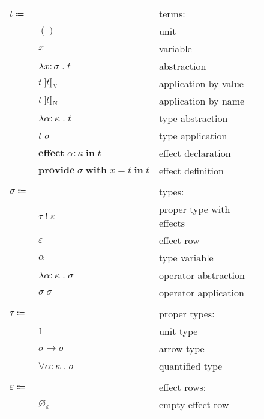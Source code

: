 \documentclass[12pt]{article}
\newcommand\anno[2]{#1 : #2} %
\newcommand\term{t}
\newcommand\eunit{()}
\newcommand\evar{x}
\newcommand\eabs[2]{\lambda #1 \; . \; #2} %
\newcommand\eappbv[2]{#1 \left\llbracket #2 \right\rrbracket_{\textsc{V}}} %
\newcommand\eappbn[2]{#1 \left\llbracket #2 \right\rrbracket_{\textsc{N}}} %
\newcommand\etabs[2]{\lambda #1 \; . \; #2} %
\newcommand\etapp[2]{#1 \; #2}
\newcommand\eeffect[3]{\textbf{effect} \; \anno{#1}{#2} \; \textbf{in} \; #3}
\newcommand\eprovide[4]{\textbf{provide} \; #1 \; \textbf{with} \; #2 = #3 \; \textbf{in} \; #4}
\newcommand\type{\sigma}
\newcommand\tptwithr[2]{#1 \; ! \; #2} %
\newcommand\tvar{\alpha}
\newcommand\tabs[2]{\lambda #1 \; . \; #2} %
\newcommand\tapp[2]{#1 \; #2} %
\newcommand\properType{\tau}
\newcommand\ptunit{1}
\newcommand\ptarrow[2]{#1 \rightarrow #2} %
\newcommand\ptforall[2]{\forall #1 \; . \; #2} %
\newcommand\row{\varepsilon}
\newcommand\rempty{\varnothing_{\row}}
\newcommand\kind{\kappa}
\begin{document}
  \begin{figure}
    \begin{mdframed}[backgroundcolor=none]
      \begin{center}
        \begin{tabular}{l l l}
          $\term \Coloneqq $ & & terms: \\
          & $\eunit$ & unit \\
          & $\evar$ & variable \\
          & $\eabs{\anno{\evar}{\type}}{\term}$ & abstraction \\
          & $\eappbv{\term}{\term}$ & application by value \\
          & $\eappbn{\term}{\term}$ & application by name \\
          & \color{red} $\etabs{\anno{\tvar}{\kind}}{\term}$ & \color{red} type abstraction \\
          & \color{red} $\etapp{\term}{\type}$ & \color{red} type application \\
          & $\eeffect{\tvar}{\kind}{\term}$ & effect declaration \\
          & $\eprovide{\type}{\evar}{\term}{\term}$ & effect definition \\
          \\
          $\type \Coloneqq$ & & types: \\
          & $\tptwithr{\properType}{\row}$ & proper type with effects \\
          & $\row$ & effect row \\
          & $\tvar$ & type variable \\
          & \color{red} $\tabs{\anno{\tvar}{\kind}}{\type}$ & \color{red} operator abstraction \\
          & \color{red} $\tapp{\type}{\type}$ & \color{red} operator application \\
          \\
          $\properType \Coloneqq$ & & proper types: \\
          & $\ptunit$ & unit type \\
          & $\ptarrow{\type}{\type}$ & arrow type \\
          & \color{red} $\ptforall{\anno{\tvar}{\kind}}{\type}$ & \color{red} quantified type \\
          \\
          $\row \Coloneqq$ & & effect rows: \\
          & $\rempty$ & empty effect row \\

\end{tabular}
\end{center}
\end{mdframed}
\end{figure}
\end{document}
